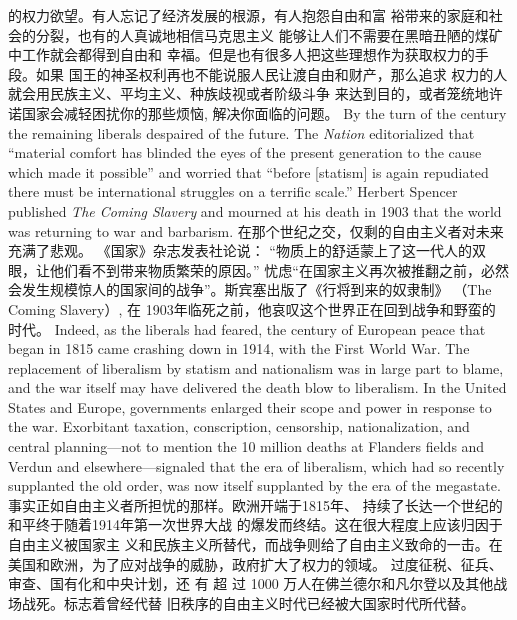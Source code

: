 \begin{paracol}{2}
的权力欲望。有人忘记了经济发展的根源，有人抱怨自由和富
裕带来的家庭和社会的分裂，也有的人真诚地相信马克思主义
能够让人们不需要在黑暗丑陋的煤矿中工作就会都得到自由和
幸福。但是也有很多人把这些理想作为获取权力的手段。如果
国王的神圣权利再也不能说服人民让渡自由和财产，那么追求
权力的人就会用民族主义、平均主义、种族歧视或者阶级斗争
来达到目的，或者笼统地许诺国家会减轻困扰你的那些烦恼,
解决你面临的问题。
\switchcolumn*
By the turn of the century the remaining liberals despaired of
the future. The \textit{Nation} editorialized that ``material comfort has
blinded the eyes of the present generation to the cause which
made it possible'' and worried that ``before [statism] is again repudiated there must be international struggles on a terrific
scale.'' Herbert Spencer published \textit{The Coming Slavery} and
mourned at his death in 1903 that the world was returning to
war and barbarism.
\switchcolumn
在那个世纪之交，仅剩的自由主义者对未来充满了悲观。
《国家》杂志发表社论说： “物质上的舒适蒙上了这一代人的双眼，让他们看不到带来物质繁荣的原因。” 忧虑“在国家主义再次被推翻之前，必然会发生规模惊人的国家间的战争”。斯宾塞出版了《行将到来的奴隶制》 （The Coming Slavery）,
在 1903年临死之前，他哀叹这个世界正在回到战争和野蛮的
时代。
\switchcolumn*
Indeed, as the liberals had feared, the century of European
peace that began in 1815 came crashing down in 1914, with
the First World War. The replacement of liberalism by statism
and nationalism was in large part to blame, and the war itself
may have delivered the death blow to liberalism. In the United
States and Europe, governments enlarged their scope and
power in response to the war. Exorbitant taxation, conscription,
censorship, nationalization, and central planning---not to mention the 10 million deaths at Flanders fields and Verdun and elsewhere---signaled that the era of liberalism, which had so recently supplanted the old order, was now itself supplanted by the era of the megastate.
\switchcolumn
事实正如自由主义者所担忧的那样。欧洲开端于1815年、
持续了长达一个世纪的和平终于随着1914年第一次世界大战
的爆发而终结。这在很大程度上应该归因于自由主义被国家主
义和民族主义所替代，而战争则给了自由主义致命的一击。在
美国和欧洲，为了应对战争的威胁，政府扩大了权力的领域。
过度征税、征兵、审查、国有化和中央计划，还 有 超 过 1000
万人在佛兰德尔和凡尔登以及其他战场战死。标志着曾经代替
旧秩序的自由主义时代已经被大国家时代所代替。


\end{paracol}
